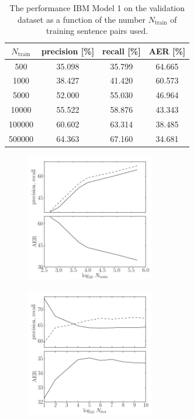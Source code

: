\documentclass[11pt]{article}
\newcommand{\figlabel}[1]{\label{fig:#1}}
\begin{document}
\begin{table}[htbp]
\begin{center}
\begin{tabular}{c ccc}
\toprule
$N_\mathrm{train}$ & precision [\%] & recall [\%] & AER [\%] \\\midrule
500 & 35.098 & 35.799 & 64.665 \\
1000 & 38.427 & 41.420 & 60.573 \\
5000 & 52.000 & 55.030 & 46.964 \\
10000 & 55.522 & 58.876 & 43.343 \\
100000 & 60.602 & 63.314 & 38.485 \\
500000 & 64.363 & 67.160 & 34.681 \\
\bottomrule
\end{tabular}
\end{center}
\caption{%
The performance IBM Model 1 on the validation dataset
as a function of the number $N_\mathrm{train}$ of training sentence pairs used.
\label{tab:model1}}
\end{table}

\begin{figure}[htbp]
\begin{center}
    \includegraphics[width=0.5\textwidth]{model1.pdf}
\end{center}
\caption{%
\figlabel{model1}}
\end{figure}

\begin{figure}[htbp]
\begin{center}
    \includegraphics[width=0.5\textwidth]{model1_convergence.pdf}
\end{center}
\caption{%
\figlabel{model1-convergence}}
\end{figure}
\end{document}
